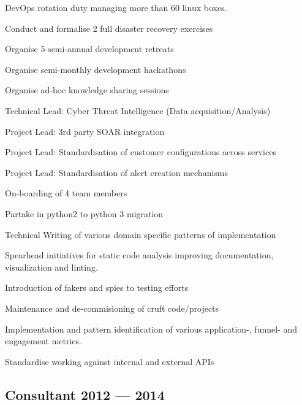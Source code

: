 

\begin{zitemize}
	\item DevOps rotation duty managing more than 60 linux boxes.
	\item Conduct and formalise 2 full disaster recovery exercises
	\item Organise 5 semi-annual development retreats
	\item Organise semi-monthly development hackathons
	\item Organise ad-hoc knowledge sharing sessions
	\item Technical Lead: Cyber Threat Intelligence (Data acquisition/Analysis)
	\item Project Lead: 3rd party SOAR integration
	\item Project Lead: Standardisation of customer configurations across services
	\item Project Lead: Standardisation of alert creation mechanisms
	\item On-boarding of 4 team members
	\item Partake in python2 to python 3 migration
	\item Technical Writing of various domain specific patterns of implementation
	\item Spearhead initiatives for static code analysis improving documentation, visualization and linting.
	\item Introduction of fakers and spies to testing efforts
	\item Maintenance and de-commisioning of cruft code/projects
	\item Implementation and pattern identification of various application-, funnel- and engagement metrics.
	\item Standardise working against internal and external APIs
\end{zitemize}

\subsection{{Consultant \hfill 2012 --- 2014}}

